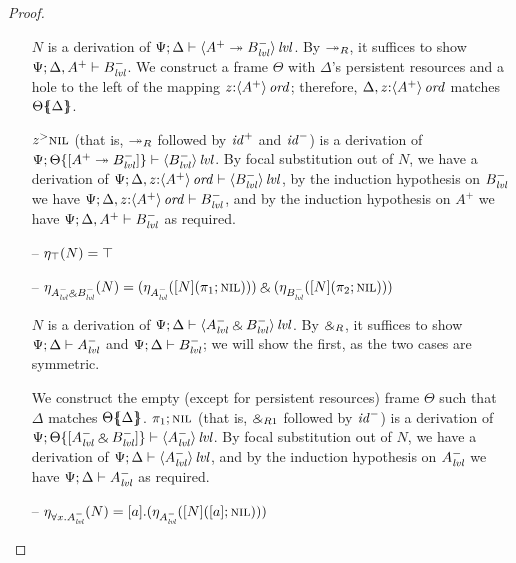\begin{proof}
\begin{itemize}
$N$ is a derivation of 
$\foc{\Psi}{\Delta}{\islvl{\susp{A^+ \righti B^-_\mlvl}}}$. By 
${\righti}_R$, it suffices to show $\foc{\Psi}{\Delta, A^+}{B^-_\mlvl}$.
We construct a frame $\Theta$ with $\Delta$'s persistent resources and 
a hole to the left of the mapping $z{:}\istrue{\susp{A^+}}$; therefore,
$\mkconj{\Delta}{z{:}\istrue{\susp{A^+}}}$ matches 
$\frameoff{\Theta}{\Delta}$.



$\tappr{z}{\tnil}$ (that is, ${\righti}_R$ followed by ${\it id}^+$ and
${\it id}^-$) is a derivation of 
$\foc{\Psi}{\tackon{\Theta}{[A^+ \righti B^-_\mlvl]}}{\islvl{\susp{B^-_\mlvl}}}$.
By focal substitution out of $N$, we have a derivation of 
$\foc{\Psi}{\Delta, z{:}\istrue{\susp{A^+}}}{\islvl{\susp{B^-_\mlvl}}}$,
by the induction hypothesis on $B^-_\mlvl$ we have
$\foc{\Psi}{\Delta, z{:}\istrue{\susp{A^+}}}{B^-_\mlvl}$, and
by the induction hypothesis on $A^+$ we have
$\foc{\Psi}{\Delta, A^+}{B^-_\mlvl}$ as required.

\smallskip

\item[--] $\etana{N}{\top} = \top$ 
\item[--] $\etana{N}{A^-_\mlvl \with B^-_\mlvl}
           = \twithr
              {(\etana{[N](\tpione{\tnil})}{A^-_\mlvl})}
              {(\etana{[N](\tpitwo{\tnil})}{B^-_\mlvl})}$
\smallskip

$N$ is a derivation of 
$\foc{\Psi}{\Delta}{\islvl{\susp{A^-_\mlvl \with B^-_\mlvl}}}$. By 
$\with_R$, it suffices to show $\foc{\Psi}{\Delta}{A^-_\mlvl}$
and $\foc{\Psi}{\Delta}{B^-_\mlvl}$; we will show the first, as the two
cases are symmetric.
\smallskip

We construct the empty (except for persistent resources) frame
$\Theta$ such that $\Delta$ matches $\frameoff{\Theta}{\Delta}$. 
$\tpione{\tnil}$ (that is, ${\with}_{R1}$ followed by ${\it id}^-$) is
a derivation of 
$\foc{\Psi}{\tackon{\Theta}{[A^-_\mlvl \with B^-_\mlvl]}}
  {\islvl{\susp{A^-_\mlvl}}}$.
By focal substitution out of $N$, we have 
a derivation of $\foc{\Psi}{\Delta}{\islvl{\susp{A^-_\mlvl}}}$, and
by the induction 
hypothesis on $A^-_\mlvl$ we have 
 $\foc{\Psi}{\Delta}{A^-_\mlvl}$ as required.
\smallskip

\item[--] $\etana{N}{\forall x.A^-_\mlvl}
           = \tforallr{a}{(\etana{[N](\tforalll{a}{\tnil})}{A^-_\mlvl})}$

\end{itemize}

\end{proof}

